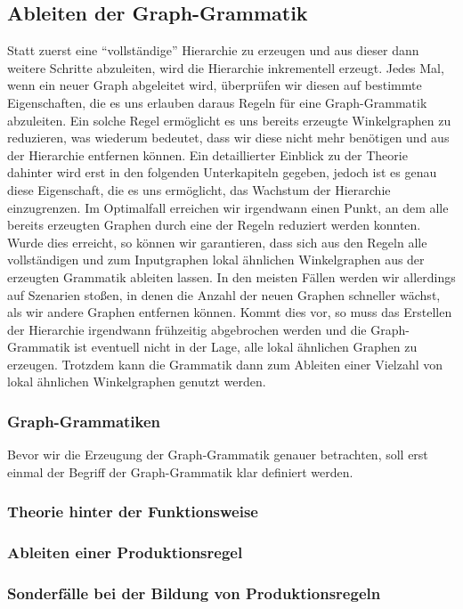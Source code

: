 \subsection{Ableiten der Graph-Grammatik}
Statt zuerst eine ``vollständige'' Hierarchie zu erzeugen und aus
dieser dann weitere Schritte abzuleiten, wird die Hierarchie inkrementell erzeugt. Jedes Mal, wenn ein neuer Graph abgeleitet wird, überprüfen
wir diesen auf bestimmte Eigenschaften, die es uns erlauben daraus Regeln für eine Graph-Grammatik abzuleiten. Ein solche Regel ermöglicht es
uns bereits erzeugte Winkelgraphen zu reduzieren, was wiederum bedeutet, dass wir diese nicht mehr benötigen und aus der Hierarchie entfernen
können. Ein detaillierter Einblick zu der Theorie dahinter wird erst in den folgenden Unterkapiteln gegeben, jedoch ist es genau diese Eigenschaft,
die es uns ermöglicht, das Wachstum der Hierarchie einzugrenzen. Im Optimalfall erreichen wir irgendwann einen Punkt, an dem alle bereits erzeugten
Graphen durch eine der Regeln reduziert werden konnten. Wurde dies erreicht, so können wir garantieren, dass sich aus den Regeln alle vollständigen
und zum Inputgraphen lokal ähnlichen Winkelgraphen aus der erzeugten Grammatik ableiten lassen. In den meisten Fällen werden wir allerdings auf
Szenarien stoßen, in denen die Anzahl der neuen Graphen schneller wächst, als wir andere Graphen entfernen können. Kommt dies vor, so muss das
Erstellen der Hierarchie irgendwann frühzeitig abgebrochen werden und die Graph-Grammatik ist eventuell nicht in der Lage, alle lokal ähnlichen
Graphen zu erzeugen. Trotzdem kann die Grammatik dann zum Ableiten einer Vielzahl von lokal ähnlichen Winkelgraphen genutzt werden.

\subsubsection{Graph-Grammatiken}
Bevor wir die Erzeugung der Graph-Grammatik genauer betrachten, soll erst einmal der Begriff der Graph-Grammatik klar definiert werden.

\subsubsection{Theorie hinter der Funktionsweise}

\subsubsection{Ableiten einer Produktionsregel}

\subsubsection{Sonderfälle bei der Bildung von Produktionsregeln}
